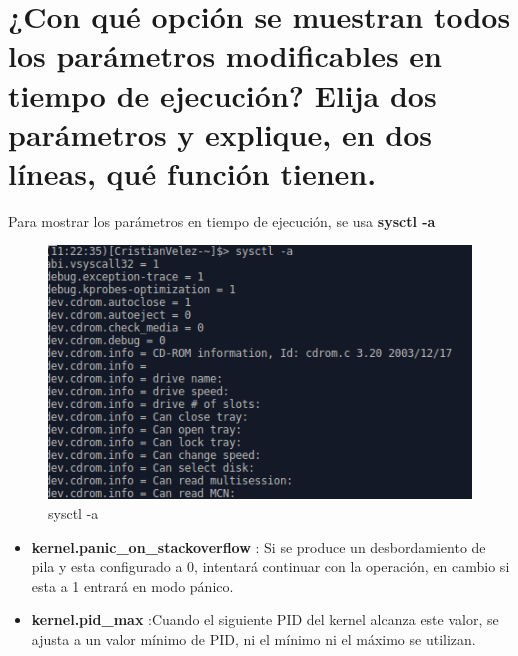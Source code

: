 

	
	

\section[Cuestión 2]{¿Con qué opción se muestran todos los parámetros modificables en tiempo de ejecución? Elija dos parámetros y explique, en dos líneas, qué función tienen.}

Para mostrar los parámetros en tiempo de ejecución, se usa \textbf{sysctl -a} \cite{kernel} \cite{sysctl}

\begin{figure}[H] %
	\centering
	\includegraphics[scale=0.5]{pics/a}  %
	\caption{sysctl -a} \label{fig:kernel4}
\end{figure}

\begin{itemize}
	\item \textbf{kernel.panic\_on\_stackoverflow} : Si se produce un desbordamiento de pila y esta configurado a 0, intentará continuar con la operación, en cambio si esta a 1 entrará en modo pánico.
	
	\item \textbf{kernel.pid\_max} :Cuando el siguiente PID del kernel alcanza este valor, se ajusta a un valor mínimo de PID, ni el mínimo ni el máximo se utilizan.
\end{itemize}


